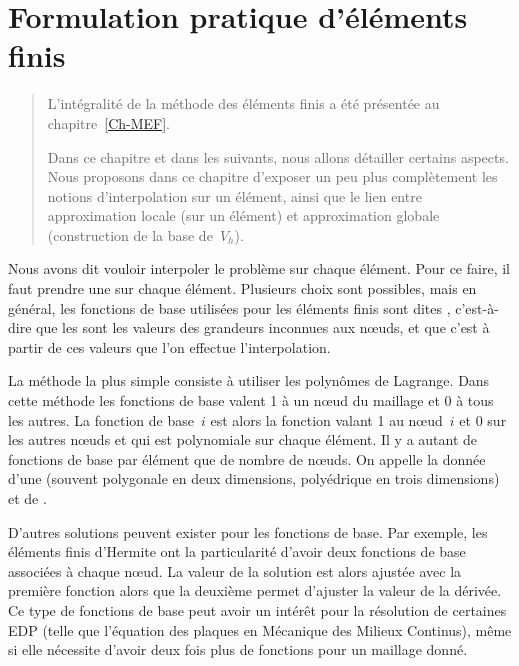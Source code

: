 \chapter{Formulation pratique d'éléments finis}\label{Ch-Elts}
\begin{abstract}
L'intégralité de la méthode des éléments finis a été présentée au chapitre~\ref{Ch-MEF}.

Dans ce chapitre et dans les suivants, nous allons détailler certains aspects.
Nous proposons dans ce chapitre d'exposer un peu plus complètement les notions
d'interpolation sur un élément, ainsi que le lien entre approximation locale
(sur un élément) et approximation globale (construction de la base de~$V_h$).
\end{abstract}


Nous avons dit vouloir interpoler le problème sur chaque élément.
Pour ce faire, il faut prendre une  sur chaque élément.
Plusieurs choix sont possibles, mais en général, les fonctions de base utilisées pour les
éléments finis sont dites , c'est-à-dire que les
 sont les valeurs des grandeurs inconnues aux nœuds,
et que c'est à partir de ces valeurs que l'on effectue l'interpolation.

\medskip
La méthode la plus simple consiste à utiliser les polynômes de Lagrange.
Dans cette méthode les fonctions de base valent 1 à un nœud du maillage et 0 à tous les autres.
La fonction de base~$i$ est alors la fonction valant 1 au nœud~$i$ et 0 sur les autres nœuds
et qui est polynomiale sur chaque élément.
Il y a autant de fonctions de base par élément que de nombre de nœuds.
On appelle  la donnée d'une 
(souvent polygonale en deux dimensions, polyédrique en trois dimensions) et de .

\medskip
D'autres solutions peuvent exister pour les fonctions de base.
Par exemple, les éléments finis d'Hermite
ont la particularité d'avoir deux fonctions de base associées à chaque nœud.
La valeur de la solution est alors ajustée avec la première fonction alors que la deuxième
permet d'ajuster la valeur de la dérivée.
Ce type de fonctions de base peut avoir un intérêt pour la résolution de certaines EDP
(telle que l'équation des plaques en Mécanique des Milieux Continus), même si elle nécessite d'avoir deux fois plus
de fonctions pour un maillage donné.








